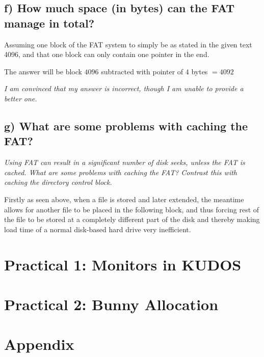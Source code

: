 \documentclass[11pt,a4paper]{article}
\theoremstyle{plain}
\theoremstyle{definition}
\theoremstyle{remark}
\numberwithin{equation}{section}
\begin{document}
\subsection*{f) How much space (in bytes) can the FAT manage in total?}
Assuming one block of the FAT system to simply be as stated in the given text 4096, and that one block can only contain one pointer in the end.

The answer will be block $4096$ subtracted with pointer of $4$ bytes $= 4092$

\textit{I am convinced that my answer is incorrect, though I am unable to provide a better one.}


\subsection*{g) What are some problems with caching the FAT?}
\textit{Using FAT can result in a significant number of disk seeks, unless the FAT is cached. What are some problems with caching the FAT? Contrast this with caching the directory control block.}

Firstly as seen above, when a file is stored and later extended, the meantime allows for another file to be placed in the following block, and thus forcing rest of the file to be stored at a completely different part of the disk and thereby making load time of a normal disk-based hard drive very inefficient.



\section*{Practical 1: Monitors in KUDOS}




\section*{Practical 2: Bunny Allocation}



\section*{Appendix}




%
%
\end{document}
